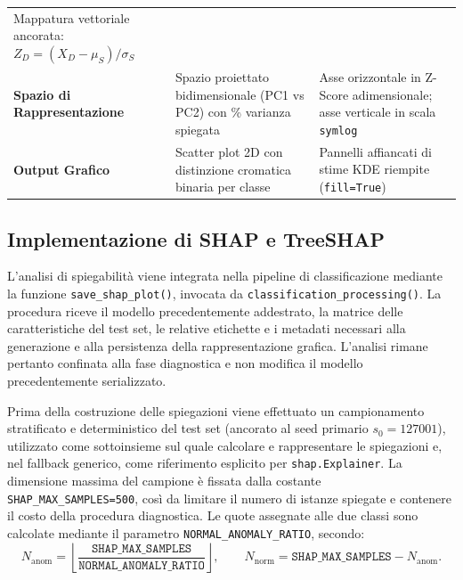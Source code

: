 \begin{table}[H]
\begin{tabularx}{\textwidth}{>{\raggedright\arraybackslash}p{4cm} >{\raggedright\arraybackslash}X >{\raggedright\arraybackslash}X}
        Mappatura vettoriale ancorata: $Z_D = (X_D - \mu_S)/\sigma_S$ \\
        \addlinespace
        \textbf{Spazio di Rappresentazione} & 
        Spazio proiettato bidimensionale (PC1 vs PC2) con \% varianza spiegata & 
        Asse orizzontale in Z-Score adimensionale; asse verticale in scala \texttt{symlog} \\
        \addlinespace
        \textbf{Output Grafico} & 
        Scatter plot 2D con distinzione cromatica binaria per classe & 
        Pannelli affiancati di stime KDE riempite (\texttt{fill=True}) \\
        \bottomrule
    \end{tabularx}
\end{table}

\subsection{Implementazione di SHAP e TreeSHAP}
\label{subsec:implementazione_shap}

L'analisi di spiegabilità viene integrata nella pipeline di classificazione mediante la funzione \texttt{save\_shap\_plot()}, invocata da \texttt{classification\_processing()}. 
La procedura riceve il modello precedentemente addestrato, la matrice delle caratteristiche del test set, le relative etichette e i metadati necessari alla generazione e alla persistenza della rappresentazione grafica. 
L'analisi rimane pertanto confinata alla fase diagnostica e non modifica il modello precedentemente serializzato.

Prima della costruzione delle spiegazioni viene effettuato un campionamento stratificato e deterministico del test set (ancorato al seed primario $s_0=127001$), utilizzato come sottoinsieme sul quale calcolare e rappresentare le spiegazioni e, nel fallback generico, come riferimento esplicito per \texttt{shap.Explainer}. 
La dimensione massima del campione è fissata dalla costante \texttt{SHAP\_MAX\_SAMPLES=500}, così da limitare il numero di istanze spiegate e contenere il costo della procedura diagnostica. 
Le quote assegnate alle due classi sono calcolate mediante il parametro \texttt{NORMAL\_ANOMALY\_RATIO}, secondo:
\begin{equation}
N_{\mathrm{anom}} =
\left\lfloor
\frac{\texttt{SHAP\_MAX\_SAMPLES}}
{\texttt{NORMAL\_ANOMALY\_RATIO}}
\right\rfloor,
\qquad
N_{\mathrm{norm}} =
\texttt{SHAP\_MAX\_SAMPLES}-N_{\mathrm{anom}}.
\label{eq:shap_sample_quotas}
\end{equation}

